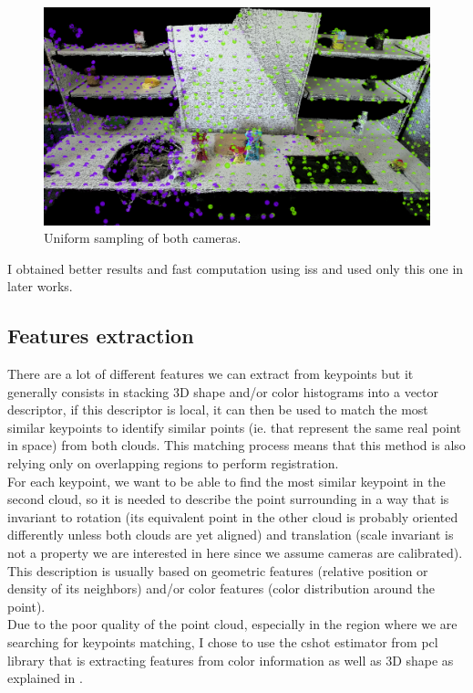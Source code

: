     \begin{figure}[h!]
        \centering
        \includegraphics[width=\textwidth]{images/unif_100.png}
        \caption{Uniform sampling of both cameras.}
        \label{fig:unif_kp}
    \end{figure}    
    
    I obtained better results and fast computation using \acrshort{iss} and used only this one in later works.

\subsection{Features extraction}

    There are a lot of different features we can extract from keypoints but it generally consists in stacking 3D shape and/or color histograms into a vector descriptor, if this descriptor is local, it can then be used to match the most similar keypoints to identify similar points (ie. that represent the same real point in space) from both clouds. This matching process means that this method is also relying only on overlapping regions to perform registration. \\
    For each keypoint, we want to be able to find the most similar keypoint in the second cloud, so it is needed to describe the point surrounding in a way that is invariant to rotation (its equivalent point in the other cloud is probably oriented differently unless both clouds are yet aligned) and translation (scale invariant is not a property we are interested in here since we assume cameras are  calibrated). This description is usually based on geometric features (relative position or density of its neighbors) and/or color features (color distribution around the point). \\
    Due to the poor quality of the point cloud, especially in the region where we are searching for keypoints matching, I chose to use the \acrshort{cshot} estimator from \acrshort{pcl} \gls{library} that is extracting features from color information as well as 3D shape as explained in \cite{tombari2011}.
    
